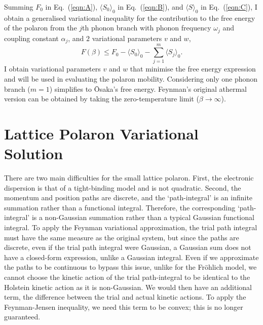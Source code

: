 Summing $F_0$ in Eq.~(\ref{eqn:A}), $\langle S_0 \rangle_0$ in Eq.~(\ref{eqn:B}), and $\langle S \rangle_0$ in Eq.~(\ref{eqn:C}), I obtain a generalised variational inequality for the contribution to the free energy of the polaron from the $j$th phonon branch with phonon frequency $\omega_j$ and coupling constant $\alpha_j$, and $2$ variational parameters $v$ and $w$, 
\begin{equation}\label{eqn:multi_feynman_jensen}
        F(\beta) \leq F_0 - \langle S_0 \rangle_0 - \sum_{j=1}^m \langle S_j \rangle_0 .
\end{equation}
I obtain variational parameters $v$ and $w$ that minimise the free energy expression and will be used in evaluating the polaron mobility. Considering only one phonon branch ($m = 1$) simplifies to \=Osaka's free energy. Feynman's original athermal version can be obtained by taking the zero-temperature limit ($\beta \rightarrow \infty$).

\section{Lattice Polaron Variational Solution}

There are two main difficulties for the small lattice polaron. First, the electronic dispersion is that of a tight-binding model and is not quadratic. Second, the momentum and position paths are discrete, and the `path-integral' is an infinite summation rather than a functional integral. Therefore, the corresponding `path-integral' is a non-Gaussian summation rather than a typical Gaussian functional integral. To apply the Feynman variational approximation, the trial path integral must have the same measure as the original system, but since the paths are discrete, even if the trial path integral were Gaussian, a Gaussian sum does not have a closed-form expression, unlike a Gaussian integral. Even if we approximate the paths to be continuous to bypass this issue, unlike for the Fr\"ohlich model, we cannot choose the kinetic action of the trial path-integral to be identical to the Holstein kinetic action as it is non-Gaussian. We would then have an additional term, the difference between the trial and actual kinetic actions. To apply the Feynman-Jensen inequality, we need this term to be convex; this is no longer guaranteed.

